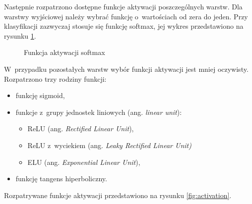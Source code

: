 Następnie rozpatrzono dostępne funkcje aktywacji poszczególnych warstw.
Dla warstwy wyjściowej należy wybrać funkcję o~wartościach od zera do jeden.
Przy klasyfikacji zazwyczaj stosuje się funkcję softmax, jej wykres
przedstawiono na rysunku \ref{fig:softmax}.
\begin{figure}[htbp]
\centering
{}
\caption{Funkcja aktywacji softmax}
\label{fig:softmax}
\end{figure}
W~przypadku pozostałych warstw wybór funkcji aktywacji jest mniej oczywisty.
Rozpatrzono trzy rodziny funkcji:
\begin{itemize}
	\item funkcję sigmoid,
	\item funkcje z~grupy jednostek liniowych (ang. \emph{linear unit}):
		\begin{itemize}	
        	\item ReLU (ang. \emph{Rectified Linear Unit}),
        	\item ReLU z~wyciekiem (ang. \emph{Leaky Rectified Linear Unit)}
        	\item ELU (ang. \emph{Exponential Linear Unit}),
        \end{itemize}
	\item funkcję tangens hiperboliczny.
\end{itemize}
Rozpatrywane funkcje aktywacji przedstawiono na rysunku \ref{fig:activation}.

